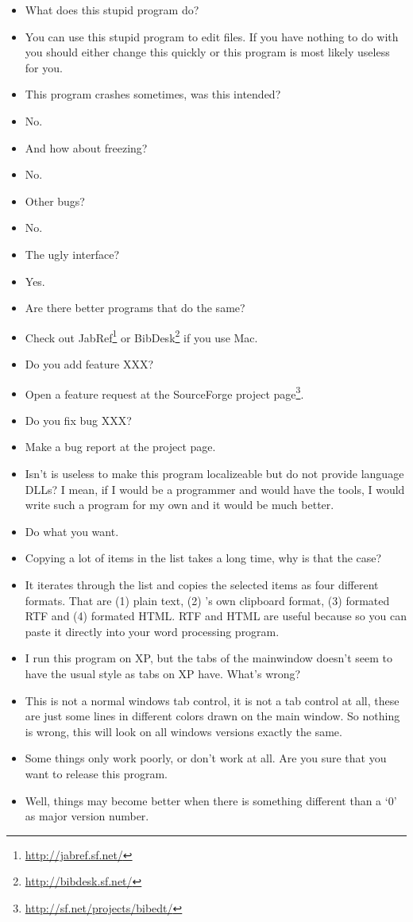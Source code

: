 \documentclass[oneside,10pt]{article}
\newcommand{\question}[1]{\item[\textbf{Q:}] #1 \vspace{-1.5ex}}
\newcommand{\answer}[1]{\item[\textbf{A:}] #1}
\begin{document}
\begin{itemize}
  \question{What does this stupid program do?}
  \answer{You can use this stupid program to edit \BibTeX{} files. If you have
    nothing to do with \BibTeX{} you should either change this quickly or this
    program is most likely useless for you.}

  \question{This program crashes sometimes, was this intended?}
  \answer{No.}
  
  \question{And how about freezing?}
  \answer{No.}

  \question{Other bugs?}
  \answer{No.}

  \question{The ugly interface?}
  \answer{Yes.}

  \question{Are there better programs that do the same?}
  \answer{Check out JabRef\footnote{\url{http://jabref.sf.net/}} or BibDesk\footnote{\url{http://bibdesk.sf.net/}}
     if you use Mac.}

  \question{Do you add feature XXX?}
  \answer{Open a feature request at the SourceForge project page\footnote{\url{http://sf.net/projects/bibedt/}}.}

  \question{Do you fix bug XXX?}
  \answer{Make a bug report at the project page.}
  
  \question{Isn't is useless to make this program localizeable but do not provide
    language DLLs? I mean, if I would be a programmer and would have the tools,
    I would write such a program for my own and it would be much better.}
  \answer{Do what you want.}

  \question{Copying a lot of items in the list takes a long time, why is that the case?}
  \answer{It iterates through the list and copies the selected items as four different
     formats. That are (1) plain text, (2) \BibEdt{}'s own clipboard format,
     (3) formated RTF and (4) formated HTML. RTF and HTML are useful because so
     you can paste it directly into your word processing program.}

  \question{I run this program on XP, but the tabs\index{Tab} of the mainwindow doesn't seem to have
     the usual style as tabs on XP have. What's wrong?}
  \answer{This is not a normal windows tab control, it is not a tab control at all, these
     are just some lines in different colors drawn on the main window. So nothing
     is wrong, this will look on all windows versions exactly the same.}

  \question{Some things only work poorly, or don't work at all. Are you sure that
    you want to release this program.}
  \answer{Well, things may become better when there is something different than a `0'
    as major version number.}
    

\end{itemize}
\end{document}
